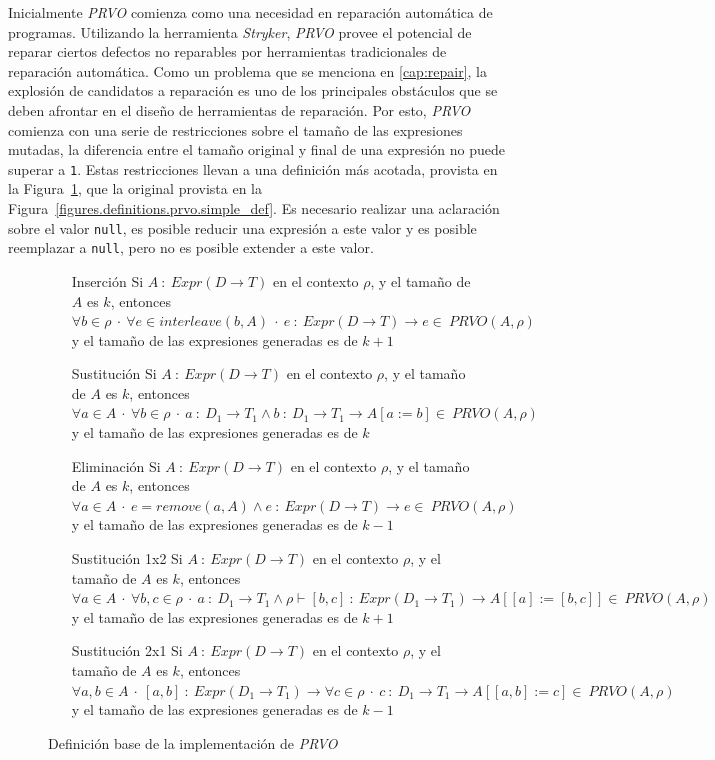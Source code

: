 Inicialmente \emph{PRVO} comienza como una necesidad en reparaci\'on autom\'atica de programas. Utilizando la herramienta \emph{Stryker}, \emph{PRVO} provee el potencial de reparar ciertos defectos no reparables por herramientas tradicionales de reparaci\'on autom\'atica. Como un problema que se menciona en \ref{cap:repair}, la explosi\'on de candidatos a reparaci\'on es uno de los principales obst\'aculos que se deben afrontar en el dise\~no de herramientas de reparaci\'on. Por esto, \emph{PRVO} comienza con una serie de restricciones sobre el tama\~no de las expresiones mutadas, la diferencia entre el tama\~no original y final de una expresi\'on no puede superar a \texttt{1}. Estas restricciones llevan a una definici\'on m\'as acotada, provista en la Figura~\ref{figures.definitions.prvo.impl_def}, que la original provista en la Figura~\ref{figures.definitions.prvo.simple_def}. Es necesario realizar una aclaraci\'on sobre el valor \texttt{null}, es posible reducir una expresi\'on a este valor y es posible reemplazar a \texttt{null}, pero no es posible extender a este valor.

\begin{figure}[H]
	\begin{enumerate}[leftmargin=.75cm,align=left]
		\item [Inserci\'on] Si $A\::\:Expr(D \rightarrow T)$ en el contexto $\rho$, y el tama\~no de $A$ es $k$, entonces $\forall b \in \rho \:\cdot\:  \forall e \in interleave(b, A)\:\cdot\: e\::\: Expr(D \rightarrow T) \rightarrow e\in\:PRVO(A, \rho)$ y el tama\~no de las expresiones generadas es de $k+1$
		\item [Sustituci\'on] Si $A\::\:Expr(D \rightarrow T)$ en el contexto $\rho$, y el tama\~no de $A$ es $k$, entonces $\forall a \in A \:\cdot\: \forall b \in \rho \:\cdot\: a\::\:D_1 \rightarrow T_1 \wedge b\::\:D_1 \rightarrow T_1 \rightarrow A[a := b] \in\:PRVO(A, \rho)$ y el tama\~no de las expresiones generadas es de $k$
		\item[Eliminaci\'on] Si $A\::\:Expr(D \rightarrow T)$ en el contexto $\rho$, y el tama\~no de $A$ es $k$, entonces $\forall a \in A \:\cdot\: e = remove(a,A) \wedge e\::\:Expr(D \rightarrow T) \rightarrow e\in\:PRVO(A, \rho)$ y el tama\~no de las expresiones generadas es de $k-1$
		\item[Sustituci\'on 1x2] Si $A\::\:Expr(D \rightarrow T)$ en el contexto $\rho$, y el tama\~no de $A$ es $k$, entonces $\forall a \in A \:\cdot\: \forall b,c \in\rho \:\cdot\: a\::\:D_1 \rightarrow T_1 \wedge \rho\vdash[b,c]\::\:Expr(D_1 \rightarrow T_1) \rightarrow A[[a] := [b,c]] \in\:PRVO(A, \rho)$ y el tama\~no de las expresiones generadas es de $k+1$
		\item[Sustituci\'on 2x1] Si $A\::\:Expr(D \rightarrow T)$ en el contexto $\rho$, y el tama\~no de $A$ es $k$, entonces $\forall a,b \in A \:\cdot\: [a,b]\::\:Expr(D_1 \rightarrow T_1) \rightarrow \forall c \in \rho \:\cdot\: c \::\: D_1 \rightarrow T_1 \rightarrow A[[a,b] := c] \in\:PRVO(A, \rho)$ y el tama\~no de las expresiones generadas es de $k-1$
	\end{enumerate}
	\caption{Definici\'on base de la implementaci\'on de \emph{PRVO}}
	\label{figures.definitions.prvo.impl_def}
\end{figure}


